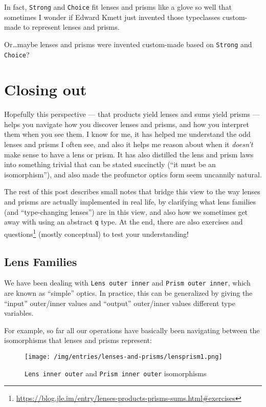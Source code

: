 \documentclass[]{article}
\renewcommand{\href}[2]{#2\footnote{\url{#1}}}
\begin{document}
In fact, \texttt{Strong} and \texttt{Choice} fit lenses and prisms like a glove
so well that sometimes I wonder if Edward Kmett just invented those typeclasses
custom-made to represent lenses and prisms.

Or\ldots maybe lenses and prisms were invented custom-made based on
\texttt{Strong} and \texttt{Choice}?

\section{Closing out}\label{closing-out}

Hopefully this perspective --- that products yield lenses and sums yield prisms
--- helps you navigate how you discover lenses and prisms, and how you interpret
them when you see them. I know for me, it has helped me understand the odd
lenses and prisms I often see, and also it helps me reason about when it
\emph{doesn't} make sense to have a lens or prism. It has also distilled the
lens and prism laws into something trivial that can be stated succinctly (``it
must be an isomorphism''), and also made the profunctor optics form seem
uncannily natural.

The rest of this post describes small notes that bridge this view to the way
lenses and prisms are actually implemented in real life, by clarifying what lens
families (and ``type-changing lenses'') are in this view, and also how we
sometimes get away with using an abstract \texttt{q} type. At the end, there are
also
\href{https://blog.jle.im/entry/lenses-products-prisms-sums.html\#exercises}{exercises
and questions} (mostly conceptual) to test your understanding!

\subsection{Lens Families}\label{lens-families}

We have been dealing with \texttt{Lens\textquotesingle{}\ outer\ inner} and
\texttt{Prism\textquotesingle{}\ outer\ inner}, which are known as ``simple''
optics. In practice, this can be generalized by giving the ``input'' outer/inner
values and ``output'' outer/inner values different type variables.

For example, so far all our operations have basically been navigating between
the isomorphisms that lenses and prisms represent:

\begin{figure}
\centering
\texttt{[image: /img/entries/lenses-and-prisms/lensprism1.png]}
\caption{\texttt{Lens\textquotesingle{}\ inner\ outer} and
\texttt{Prism\textquotesingle{}\ inner\ outer} isomorphisms}
\end{figure}
\end{document}
